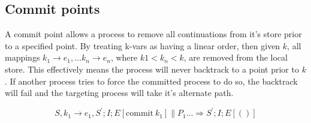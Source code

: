 \documentclass[11pt]{article}
\begin{document}
\subsection{Commit points}
\label{subsec:commit}
A commit point allows a process to remove all continuations from it's
store prior to a specified point. By treating k-vars as having a linear
order, then given $k$, all mappings $k_1 \to e_1, \dots k_n \to e_n$, where
$k1 < k_n < k$, are removed from the local store. This effectively means
the process will never backtrack to a point prior to $k$. If another
process tries to force the committed process to do so, the backtrack
will fail and the targeting process will take it's alternate path.

$$
S,k_1 \to e_1,S^\prime;I;E[\text{commit}~k_1] \parallel P_1 \dots
\Rightarrow S^\prime;I;E[()]
$$

%
%
%
\end{document}
